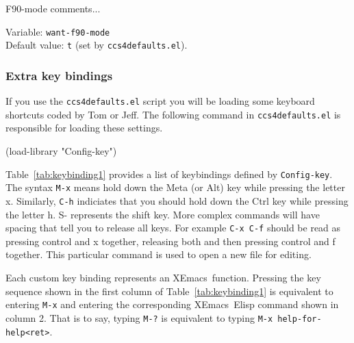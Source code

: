 \documentclass[11pt]{nmemo}
\newcommand{\comp}[1]{{\normalfont\texttt{\footnotesize{#1}}}}
\newcommand{\xemacs}{{\normalfont\sffamily XEmacs}}
\newenvironment{code}
{\footnotesize 
  \VerbatimEnvironment
  \begin{SaveVerbatim}{\mycode}}%
  {\end{SaveVerbatim}%
  \noindent%
  \UseVerbatim{\mycode}\normalsize}
\begin{document}
F90-mode comments...

Variable: \comp{want-f90-mode} \\
Default value: \comp{t} (set by \comp{ccs4defaults.el}).

\subsubsection{Extra key bindings}
\label{sec:keybindings}

If you use the \comp{ccs4defaults.el} script you will be loading some
keyboard shortcuts %
coded by Tom or Jeff.  The following command in \comp{ccs4defaults.el}
is responsible for loading these settings.

\begin{code}
     (load-library "Config-key")
\end{code}

Table~\ref{tab:keybinding1} provides a list of keybindings defined by
\comp{Config-key}.  The syntax \comp{M-x} means hold down the Meta (or
Alt) key while pressing the letter x.  Similarly, \comp{C-h}
indiciates that you should hold down the Ctrl key while pressing the
letter h.  S- represents the shift key.  More complex commands will
have spacing that tell you to release all keys.  For example
\comp{C-x~C-f} should be read as pressing control and x together,
releasing both and then pressing control and f together.  This
particular command is used to open a new file for editing.  

Each custom key binding represents an \xemacs\ function.  Pressing the
key sequence shown in the first column of Table~\ref{tab:keybinding1}
is equivalent to entering \comp{M-x} and entering the corresponding
\xemacs\ Elisp command shown in column 2.  That is to say, typing
\comp{M-?} is equivalent to typing \comp{M-x help-for-help<ret>}.
\end{document}
